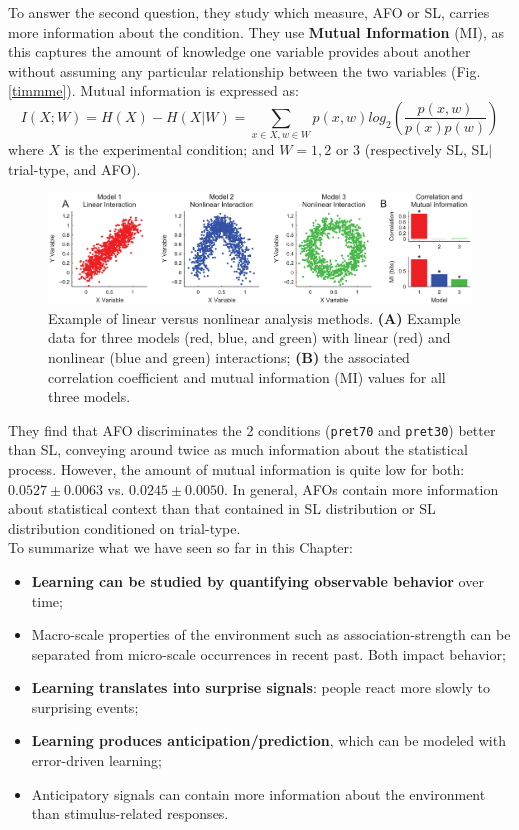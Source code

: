 To answer the second question, they study which measure, AFO or SL, carries more information about the condition. They use \textbf{Mutual Information} (MI), as this captures the amount of knowledge one variable provides about another without assuming any particular relationship between the two variables (Fig. \ref{timmme}). Mutual information is expressed as:
\[
I(X;W) = H(X) - H(X|W) = \sum_{x \in X, w \in W} p(x,w) log_2 \left( \frac{p(x,w)}{p(x)p(w)} \right)
\]
where $X$ is the experimental condition; and $W=1,2\text{ or }3$ (respectively SL, SL$\vert$trial-type, and AFO).

\begin{figure}[!ht]
    \centering
    \captionsetup{width=.8\linewidth}
    \includegraphics[width=0.85\linewidth]{images/timme.png}
    \caption{Example of linear versus nonlinear analysis methods. \textbf{(A)} Example data for three models (red, blue, and green) with linear (red) and nonlinear (blue and green) interactions; \textbf{(B)} the associated correlation coefficient and mutual information (MI) values for all three models.}
    \label{fig:timme}
\end{figure}

They find that AFO discriminates the 2 conditions (\texttt{pret70} and \texttt{pret30}) better than SL, conveying around twice as much information about the statistical process.
However, the amount of mutual information is quite low for both: $0.0527 \pm 0.0063$ vs. $0.0245 \pm 0.0050$. In general, AFOs contain more information about statistical context than that contained in SL distribution or SL distribution conditioned on trial-type.\\

To summarize what we have seen so far in this Chapter:
\begin{itemize}
    \item \textbf{Learning can be studied by quantifying observable behavior} over time;
    \item Macro-scale properties of the environment such as association-strength can be separated from micro-scale occurrences in recent past. Both impact behavior;
    \item \textbf{Learning translates into surprise signals}: people react more slowly to surprising events;
    \item \textbf{Learning produces anticipation/prediction}, which can be modeled with error-driven learning;
    \item Anticipatory signals can contain more information about the environment than stimulus-related responses.
\end{itemize}

